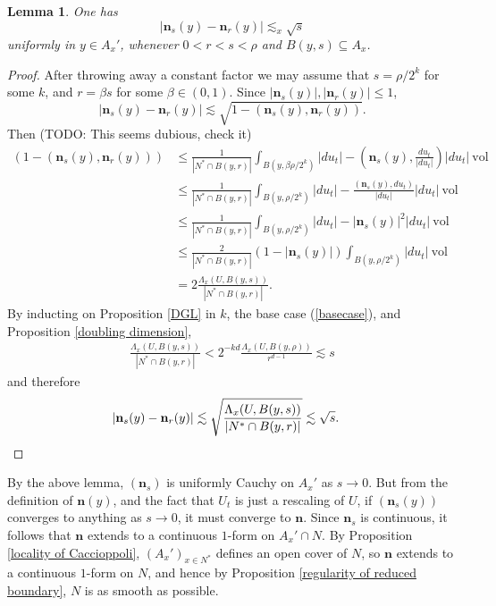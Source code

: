 \documentclass[reqno,12pt,letterpaper]{amsart}
\newcommand{\normal}{\mathbf n}
\newcommand{\vol}{\mathrm{vol}}
\newtheorem{lemma}[theorem]{Lemma}
\theoremstyle{definition}
\numberwithin{equation}{section}
\begin{document}
\begin{lemma}
One has
$$|\normal_s(y) - \normal_r(y)| \lesssim_x \sqrt s$$
uniformly in $y \in A_x'$, whenever $0 < r < s < \rho$ and $B(y, s) \subseteq A_x$.
\end{lemma}
\begin{proof}
After throwing away a constant factor we may assume that $s = \rho/2^k$ for some $k$, and $r = \beta s$ for some $\beta \in (0, 1)$.
Since $|\normal_s(y)|,|\normal_r(y)| \leq 1$,
$$|\normal_s(y) - \normal_r(y)| \lesssim \sqrt{1 - (\normal_s(y), \normal_r(y))}.$$
Then (TODO: This seems dubious, check it)
\begin{align*}
(1 - (\normal_s(y), \normal_r(y)))  &\leq \frac{1}{|N^* \cap B(y, r)|} \int_{B(y, \beta \rho/2^k)} |du_t| - \left(\normal_s(y), \frac{du_t}{|du_t|}\right) |du_t| ~\vol\\
&\leq \frac{1}{|N^* \cap B(y, r)|} \int_{B(y, \rho/2^k)} |du_t| - \frac{(\normal_s(y), du_t)}{|du_t|} |du_t| ~\vol \\
&\leq \frac{1}{|N^* \cap B(y, r)|} \int_{B(y, \rho/2^k)} |du_t| - |\normal_s(y)|^2 |du_t| ~\vol\\
&\leq \frac{2}{|N^* \cap B(y, r)|} (1 - |\normal_s(y)|)\int_{B(y, \rho/2^k)} |du_t| ~\vol\\
&= 2\frac{\Lambda_x(U, B(y, s))}{|N^* \cap B(y, r)|}.
\end{align*}
By inducting on Proposition \ref{DGL} in $k$, the base case (\ref{basecase}), and Proposition \ref{doubling dimension},
\begin{align*}
\frac{\Lambda_x(U, B(y, s))}{|N^* \cap B(y, r)|} < 2^{-kd} \frac{\Lambda_x(U, B(y, \rho))}{r^{d - 1}} \lesssim s
\end{align*}
and therefore
\begin{align*}
|\normal_s(y) - \normal_r(y)| &\lesssim \sqrt{\frac{\Lambda_x(U, B(y, s))}{|N^* \cap B(y, r)|}} \lesssim \sqrt s. \qedhere
\end{align*}
\end{proof}

By the above lemma, $(\normal_s)$ is uniformly Cauchy on $A_x'$ as $s \to 0$.
But from the definition of $\normal(y)$, and the fact that $U_t$ is just a rescaling of $U$, if $(\normal_s(y))$ converges to anything as $s \to 0$, it must converge to $\normal$.
Since $\normal_s$ is continuous, it follows that $\normal$ extends to a continuous $1$-form on $A_x' \cap N$.
By Proposition \ref{locality of Caccioppoli}, $(A_x')_{x \in N^*}$ defines an open cover of $N$, so $\normal$ extends to a continuous $1$-form on $N$, and hence by Proposition \ref{regularity of reduced boundary}, $N$ is as smooth as possible.
\end{document}

